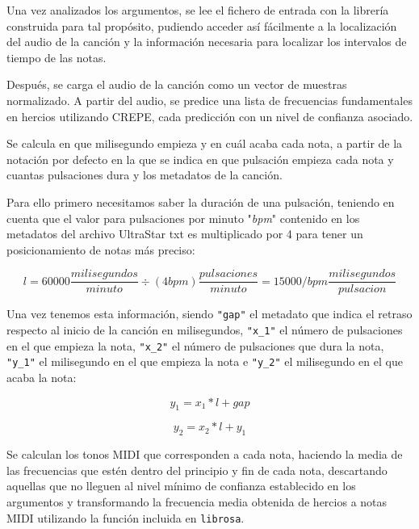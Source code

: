 Una vez analizados los argumentos, se lee el fichero de entrada con la librería construida para tal propósito, pudiendo acceder así fácilmente a la localización del audio de la canción y la información necesaria para localizar los intervalos de tiempo de las notas.

Después, se carga el audio de la canción como un vector de muestras normalizado. A partir del audio, se predice una lista de frecuencias fundamentales en hercios utilizando CREPE, cada predicción con un nivel de confianza asociado.

Se calcula en que milisegundo empieza y en cuál acaba cada nota, a partir de la notación por defecto en la que se indica en que pulsación empieza cada nota y cuantas pulsaciones dura y los metadatos de la canción.

Para ello primero necesitamos saber la duración de una pulsación, teniendo en cuenta que el valor para pulsaciones por minuto "\textit{bpm}" contenido en los metadatos del archivo UltraStar txt es multiplicado por 4 para tener un posicionamiento de notas más preciso:

\begin{displaymath}
	l = 60000 \frac{milisegundos}{minuto} \div (4bpm)\frac{pulsaciones}{minuto} = 15000 / bpm\frac{milisegundos}{pulsacion}
\end{displaymath}

Una vez tenemos esta información, siendo \texttt{"gap"} el metadato que indica el retraso respecto al inicio de la canción en milisegundos, \texttt{"x\_1"} el número de pulsaciones en el que empieza la nota, \texttt{"x\_2"} el número de pulsaciones que dura la nota, \texttt{"y\_1"} el milisegundo en el que empieza la nota e \texttt{"y\_2"} el milisegundo en el que acaba la nota:

\begin{displaymath}
	y_1 =  x_1 * l + gap
\end{displaymath}

\begin{displaymath}
	y_2 = x_2 * l + y_1
\end{displaymath}

Se calculan los tonos MIDI que corresponden a cada nota, haciendo la media de las frecuencias que estén dentro del principio y fin de cada nota, descartando aquellas que no lleguen al nivel mínimo de confianza establecido en los argumentos y transformando la frecuencia media obtenida de hercios a notas MIDI utilizando la función incluida en \texttt{librosa}.

